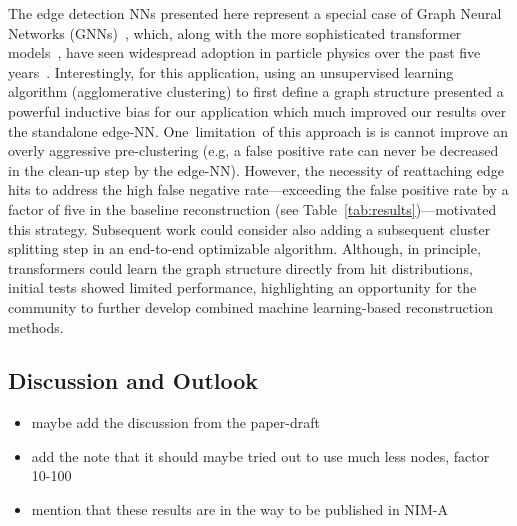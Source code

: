 The edge detection NNs presented here represent a special case of Graph Neural Networks (GNNs)~\cite{battaglia2018relational}, which, along with the more sophisticated transformer models~\cite{vaswani2017attention,amatriain2023transformer}, have seen widespread adoption in particle physics over the past five years~\cite{dezoort2021charged,ju2021performance,van2024transformers}. Interestingly, for this application, using an unsupervised learning algorithm (agglomerative clustering) to first define a graph structure presented a powerful inductive bias for our application which much improved our results over the standalone edge-NN. One limitation of this approach is is cannot improve an overly aggressive pre-clustering (e.g, a false positive rate can never be decreased  in the clean-up step by the edge-NN). However, the necessity of reattaching edge hits to address the high false negative rate—exceeding the false positive rate by a factor of five in the baseline reconstruction (see Table~\ref{tab:results})—motivated this strategy.\newline
Subsequent work could consider also adding a subsequent cluster splitting step in an end-to-end optimizable algorithm.\newline
Although, in principle, transformers could learn the graph structure directly from hit distributions, initial tests showed limited performance, highlighting an opportunity for the community to further develop combined machine learning-based reconstruction methods.\newline


\subsection{Discussion and Outlook}
\begin{itemize}
\item maybe add the discussion from the paper-draft
\item add the note that it should maybe tried out to use much less nodes, factor 10-100
\item mention that these results are in the way to be published in NIM-A
\end{itemize}

